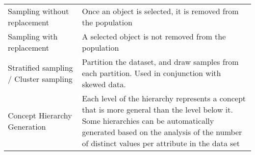 \documentclass[a4paper,8pt,twocolumn]{extarticle}
\begin{document}
\begin{table}[h]
{\begin{tabular}{p{0.3\linewidth} | p{0.7\linewidth}}
Sampling without replacement           & Once an object is selected, it is removed from the population                                                                                                                                                                             \\
Sampling with replacement              & A selected object is not removed from the population                                                                                                                                                                                      \\
Stratified sampling / Cluster sampling & Partition the dataset, and draw samples from each partition. Used in   conjunction with skewed data.                                                                                                                                      \\
Concept Hierarchy Generation           & Each level of the hierarchy represents a concept that is more general   than the level below it. Some hierarchies can be automatically generated   based on the analysis of the number of distinct values per attribute in the   data set
\end{tabular}%
}
\end{table}
\end{document}
